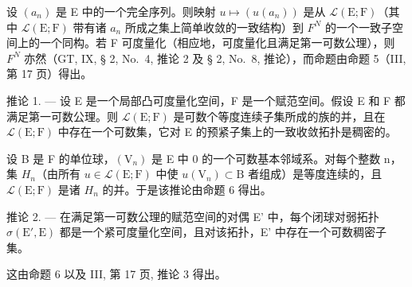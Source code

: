设 \((a_{n})\) 是 E 中的一个完全序列。则映射 \(u \mapsto (u(a_{n}))\) 是从 \(\mathcal{L}(\mathrm{E};\mathrm{F})\)（其中 \(\mathcal{L}(\mathrm{E};\mathrm{F})\) 带有诸 \(a_{n}\) 所成之集上简单收敛的一致结构）到 \(F^{N}\) 的一个一致子空间上的一个同构。若 F 可度量化（相应地，可度量化且满足第一可数公理），则 \(F^{N}\) 亦然（GT, IX, § 2, No.~4, 推论 2 及 § 2, No.~8, 推论），而命题由命题 5（III, 第 17 页）得出。

推论 1. --- 设 E 是一个局部凸可度量化空间，F 是一个赋范空间。假设 E 和 F 都满足第一可数公理。则 \(\mathcal{L}(\mathrm{E};\mathrm{F})\) 是可数个等度连续子集所成的族的并，且在 \(\mathcal{L}(\mathrm{E};\mathrm{F})\) 中存在一个可数集，它对 E 的预紧子集上的一致收敛拓扑是稠密的。

设 B 是 F 的单位球，\((\mathrm{V}_{n})\) 是 E 中 0 的一个可数基本邻域系。对每个整数 n，集 \(H_{n}\)（由所有 \(u \in \mathcal{L}(\mathrm{E}; \mathrm{F})\) 中使 \(u(\mathrm{V}_{n}) \subset \mathrm{B}\) 者组成）是等度连续的，且 \(\mathcal{L}(\mathrm{E}; \mathrm{F})\) 是诸 \(H_{n}\) 的并。于是该推论由命题 6 得出。

推论 2. --- 在满足第一可数公理的赋范空间的对偶 E' 中，每个闭球对弱拓扑 \(\sigma(\mathrm{E}',\mathrm{E})\) 都是一个紧可度量化空间，且对该拓扑，E' 中存在一个可数稠密子集。

这由命题 6 以及 III, 第 17 页, 推论 3 得出。

